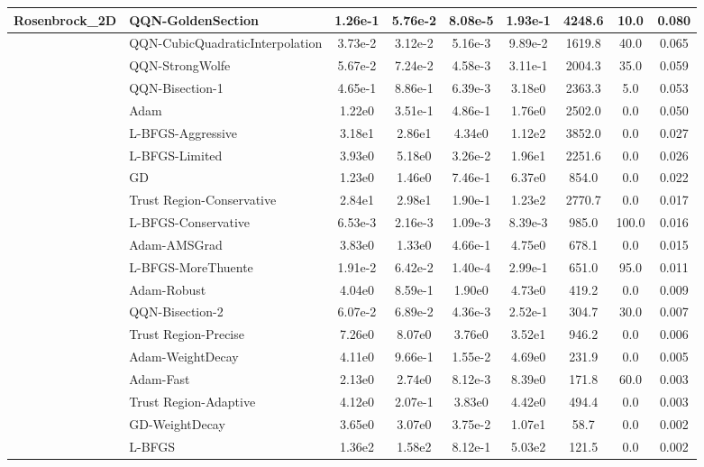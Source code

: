 \documentclass{article}
\begin{document}
\begin{longtable}{|l|l|c|c|c|c|c|c|c|}
Rosenbrock\_2D & \textbf{QQN-GoldenSection} & 1.26e-1 & 5.76e-2 & 8.08e-5 & 1.93e-1 & 4248.6 & 10.0 & 0.080 \\
\hline
 & QQN-CubicQuadraticInterpolation & 3.73e-2 & 3.12e-2 & 5.16e-3 & 9.89e-2 & 1619.8 & 40.0 & 0.065 \\
\hline
 & QQN-StrongWolfe & 5.67e-2 & 7.24e-2 & 4.58e-3 & 3.11e-1 & 2004.3 & 35.0 & 0.059 \\
\hline
 & QQN-Bisection-1 & 4.65e-1 & 8.86e-1 & 6.39e-3 & 3.18e0 & 2363.3 & 5.0 & 0.053 \\
\hline
 & Adam & 1.22e0 & 3.51e-1 & 4.86e-1 & 1.76e0 & 2502.0 & 0.0 & 0.050 \\
\hline
 & L-BFGS-Aggressive & 3.18e1 & 2.86e1 & 4.34e0 & 1.12e2 & 3852.0 & 0.0 & 0.027 \\
\hline
 & L-BFGS-Limited & 3.93e0 & 5.18e0 & 3.26e-2 & 1.96e1 & 2251.6 & 0.0 & 0.026 \\
\hline
 & GD & 1.23e0 & 1.46e0 & 7.46e-1 & 6.37e0 & 854.0 & 0.0 & 0.022 \\
\hline
 & Trust Region-Conservative & 2.84e1 & 2.98e1 & 1.90e-1 & 1.23e2 & 2770.7 & 0.0 & 0.017 \\
\hline
 & L-BFGS-Conservative & 6.53e-3 & 2.16e-3 & 1.09e-3 & 8.39e-3 & 985.0 & 100.0 & 0.016 \\
\hline
 & Adam-AMSGrad & 3.83e0 & 1.33e0 & 4.66e-1 & 4.75e0 & 678.1 & 0.0 & 0.015 \\
\hline
 & L-BFGS-MoreThuente & 1.91e-2 & 6.42e-2 & 1.40e-4 & 2.99e-1 & 651.0 & 95.0 & 0.011 \\
\hline
 & Adam-Robust & 4.04e0 & 8.59e-1 & 1.90e0 & 4.73e0 & 419.2 & 0.0 & 0.009 \\
\hline
 & QQN-Bisection-2 & 6.07e-2 & 6.89e-2 & 4.36e-3 & 2.52e-1 & 304.7 & 30.0 & 0.007 \\
\hline
 & Trust Region-Precise & 7.26e0 & 8.07e0 & 3.76e0 & 3.52e1 & 946.2 & 0.0 & 0.006 \\
\hline
 & Adam-WeightDecay & 4.11e0 & 9.66e-1 & 1.55e-2 & 4.69e0 & 231.9 & 0.0 & 0.005 \\
\hline
 & Adam-Fast & 2.13e0 & 2.74e0 & 8.12e-3 & 8.39e0 & 171.8 & 60.0 & 0.003 \\
\hline
 & Trust Region-Adaptive & 4.12e0 & 2.07e-1 & 3.83e0 & 4.42e0 & 494.4 & 0.0 & 0.003 \\
\hline
 & GD-WeightDecay & 3.65e0 & 3.07e0 & 3.75e-2 & 1.07e1 & 58.7 & 0.0 & 0.002 \\
\hline
 & L-BFGS & 1.36e2 & 1.58e2 & 8.12e-1 & 5.03e2 & 121.5 & 0.0 & 0.002 \\

\end{longtable}
\end{document}
